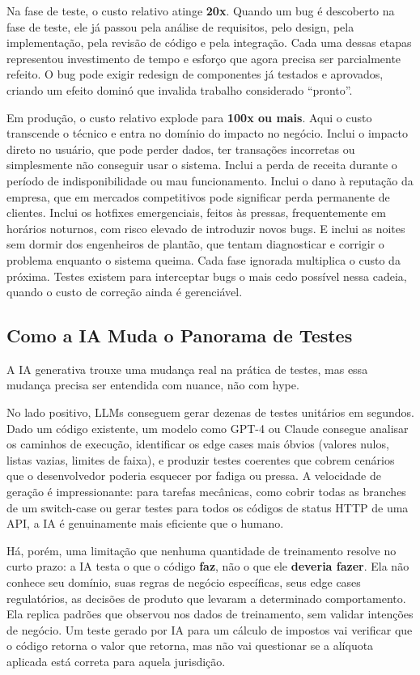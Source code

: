 Na fase de teste, o custo relativo atinge \textbf{20x}. Quando um bug é
descoberto na fase de teste, ele já passou pela análise de requisitos, pelo
design, pela implementação, pela revisão de código e pela integração. Cada
uma dessas etapas representou investimento de tempo e esforço que agora precisa
ser parcialmente refeito. O bug pode exigir redesign de componentes já testados
e aprovados, criando um efeito dominó que invalida trabalho considerado
``pronto''.

Em produção, o custo relativo explode para \textbf{100x ou mais}. Aqui o custo
transcende o técnico e entra no domínio do impacto no negócio. Inclui o impacto
direto no usuário, que pode perder dados, ter transações incorretas ou
simplesmente não conseguir usar o sistema. Inclui a perda de receita durante o
período de indisponibilidade ou mau funcionamento. Inclui o dano à reputação da
empresa, que em mercados competitivos pode significar perda permanente de
clientes. Inclui os hotfixes emergenciais, feitos às pressas, frequentemente em
horários noturnos, com risco elevado de introduzir novos bugs. E inclui as
noites sem dormir dos engenheiros de plantão, que tentam diagnosticar e corrigir
o problema enquanto o sistema queima. Cada fase ignorada multiplica o custo da
próxima. Testes existem para interceptar bugs o mais cedo possível nessa cadeia,
quando o custo de correção ainda é gerenciável.

\subsection{Como a IA Muda o Panorama de Testes}

A IA generativa trouxe uma mudança real na prática de testes, mas essa mudança
precisa ser entendida com nuance, não com hype.

No lado positivo, LLMs conseguem gerar dezenas de testes unitários em segundos.
Dado um código existente, um modelo como GPT-4 ou Claude consegue analisar os
caminhos de execução, identificar os edge cases mais óbvios (valores nulos,
listas vazias, limites de faixa), e produzir testes coerentes que cobrem
cenários que o desenvolvedor poderia esquecer por fadiga ou pressa. A velocidade
de geração é impressionante: para tarefas mecânicas, como cobrir todas as
branches de um switch-case ou gerar testes para todos os códigos de status HTTP
de uma API, a IA é genuinamente mais eficiente que o humano.

Há, porém, uma limitação que nenhuma quantidade de treinamento
resolve no curto prazo: a IA testa o que o código \textbf{faz}, não o que ele
\textbf{deveria fazer}. Ela não conhece seu domínio, suas regras de negócio
específicas, seus edge cases regulatórios, as decisões de produto que levaram a
determinado comportamento. Ela replica padrões que observou nos dados de
treinamento, sem validar intenções de negócio. Um teste gerado por IA para um
cálculo de impostos vai verificar que o código retorna o valor que retorna, mas
não vai questionar se a alíquota aplicada está correta para aquela jurisdição.

